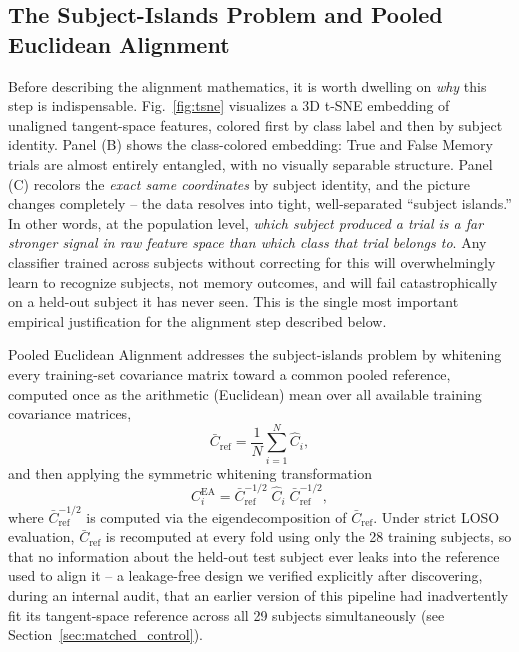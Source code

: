 \documentclass[journal]{IEEEtran}
\begin{document}
\subsection{The Subject-Islands Problem and Pooled Euclidean Alignment}
Before describing the alignment mathematics, it is worth dwelling on \emph{why} this step is indispensable. Fig.~\ref{fig:tsne} visualizes a 3D t-SNE \cite{vandermaaten2008visualizing} embedding of unaligned tangent-space features, colored first by class label and then by subject identity. Panel (B) shows the class-colored embedding: True and False Memory trials are almost entirely entangled, with no visually separable structure. Panel (C) recolors the \emph{exact same coordinates} by subject identity, and the picture changes completely -- the data resolves into tight, well-separated ``subject islands.'' In other words, at the population level, \emph{which subject produced a trial is a far stronger signal in raw feature space than which class that trial belongs to}. Any classifier trained across subjects without correcting for this will overwhelmingly learn to recognize subjects, not memory outcomes, and will fail catastrophically on a held-out subject it has never seen. This is the single most important empirical justification for the alignment step described below.

Pooled Euclidean Alignment addresses the subject-islands problem by whitening every training-set covariance matrix toward a common pooled reference, computed once as the arithmetic (Euclidean) mean over all available training covariance matrices,
\begin{equation}
\bar{C}_{\mathrm{ref}} = \frac{1}{N} \sum_{i=1}^{N} \hat{C}_i ,
\label{eq:pooled_mean}
\end{equation}
and then applying the symmetric whitening transformation
\begin{equation}
C_i^{\mathrm{EA}} = \bar{C}_{\mathrm{ref}}^{-1/2} \; \hat{C}_i \; \bar{C}_{\mathrm{ref}}^{-1/2},
\label{eq:ea_whitening}
\end{equation}
where $\bar{C}_{\mathrm{ref}}^{-1/2}$ is computed via the eigendecomposition of $\bar{C}_{\mathrm{ref}}$. Under strict LOSO evaluation, $\bar{C}_{\mathrm{ref}}$ is recomputed at every fold using only the 28 training subjects, so that no information about the held-out test subject ever leaks into the reference used to align it -- a leakage-free design we verified explicitly after discovering, during an internal audit, that an earlier version of this pipeline had inadvertently fit its tangent-space reference across all 29 subjects simultaneously (see Section~\ref{sec:matched_control}).
\end{document}
